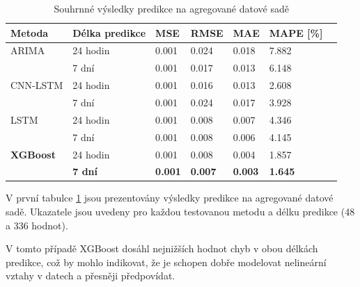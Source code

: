 \documentclass[FM,BP,fonts]{tulthesis}
\begin{document}
\begin{table}[!ht]
	\centering
	\caption{Souhrnné výsledky predikce na agregované datové sadě}
	\label{Tab:results-agg}
	\def\arraystretch{1.2}

	\begin{tabular}{lllllll}
		\hline
		\textbf{Metoda} & \textbf{Délka predikce} & \textbf{MSE} & \textbf{RMSE} & \textbf{MAE} & \textbf{MAPE [\%]} 	\\      \hline
		ARIMA           & 24 hodin       & 0.001           & 0.024              & 0.018            & 7.882             \\ 
		~               & 7 dní          &0.001          &  0.017           & 0.013              & 6.148            \\  
    
		\hline
		
		CNN-LSTM          & 24 hodin      &0.001          &  0.016           & 0.013            & 2.608              \\ 
		~               & 7 dní          & 0.001             & 0.024           & 0.017            & 3.928            \\  
		
		\hline
		
		LSTM         & 24 hodin      & 0.001     & 0.008          & 0.007           & 4.346              \\ 
		~               & 7 dní          &  0.001          & 0.008              & 0.006            & 4.145             \\  
		
		\hline
		
		\textbf{XGBoost}          & 24 hodin      & 0.001          & 0.008           & 0.004           & 1.857             \\ 
		~               & \textbf{7 dní}          & \textbf{0.001}           & \textbf{0.007}             & \textbf{0.003}            & \textbf{1.645}             \\  
		
		\hline
		
	\end{tabular}

\end{table}

V první tabulce \ref{Tab:results-agg} jsou prezentovány výsledky predikce na agregované datové sadě.  Ukazatele jsou uvedeny pro každou testovanou metodu a délku predikce (48 a 336 hodnot).

V tomto případě XGBoost dosáhl nejnižších hodnot chyb v obou délkách predikce, což by mohlo indikovat, že je schopen dobře modelovat nelineární vztahy v datech a přesněji předpovídat.
\end{document}
